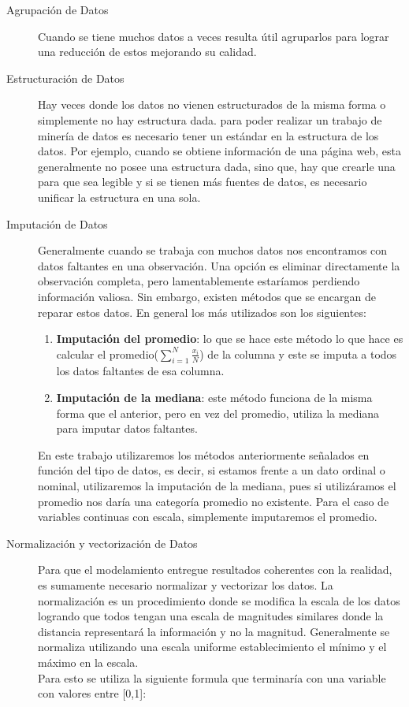 \begin{description}
  \item[Agrupación de Datos]
  Cuando se tiene muchos datos a veces resulta útil agruparlos para lograr una reducción de estos mejorando su calidad.
  \item[Estructuración de Datos]
  Hay veces donde los datos no  vienen estructurados de la misma forma o simplemente no hay estructura dada. para poder realizar un trabajo de minería de datos es necesario tener un estándar en la estructura de los datos. Por ejemplo, cuando se obtiene información de una página web, esta generalmente no posee una estructura dada, sino que, hay que crearle una para que sea legible y si se tienen más fuentes de datos, es necesario unificar la estructura en una sola.
  \item[Imputación de Datos]
  Generalmente cuando se trabaja con muchos datos nos encontramos con datos faltantes en una observación. Una opción es eliminar directamente la observación completa, pero lamentablemente estaríamos perdiendo información valiosa. Sin embargo, existen métodos que se encargan de reparar estos datos.\cite{gelman2007missingdata} En general los más utilizados son los siguientes:
 \begin{enumerate}[label=\itshape\alph*\upshape)]
  \item \textbf{Imputación del promedio}: lo que se hace este método lo que hace es calcular el promedio($\sum_{i=1}^N \frac{x_i}{N}$) de la columna y este se imputa a todos los datos faltantes de esa columna.
  \item \textbf{Imputación de la mediana}: este método funciona de la misma forma que el anterior, pero en vez del promedio, utiliza la mediana para imputar datos faltantes.
  \end{enumerate}
  En este trabajo utilizaremos los métodos anteriormente señalados en función del tipo de datos, es decir, si estamos frente a un dato ordinal o nominal, utilizaremos la imputación de la mediana, pues si utilizáramos el promedio nos daría una categoría promedio no existente. Para el caso de variables continuas con escala, simplemente imputaremos el promedio.
  \item[Normalización y vectorización de Datos]
  Para que el modelamiento entregue resultados coherentes con la realidad, es sumamente necesario normalizar y vectorizar los datos.
  La normalización es un procedimiento donde se modifica la escala de los datos logrando que todos tengan una escala de magnitudes similares donde la distancia representará la información y no la magnitud. Generalmente se normaliza utilizando una escala uniforme establecimiento el mínimo y el máximo en la escala. \\Para esto se utiliza la siguiente formula que terminaría con una variable con valores entre [0,1]:

\end{description}
